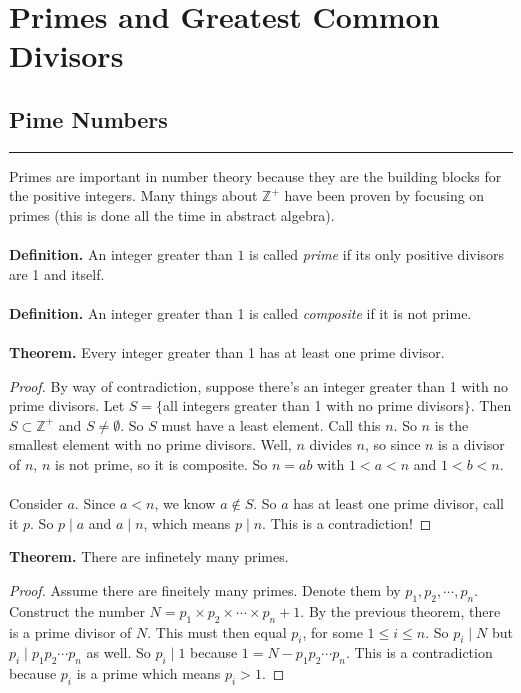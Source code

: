 \documentclass[class=article, crop=false]{standalone}
\def\integers{{\mathbb Z}}
\begin{document}
    
\section{Primes and Greatest Common Divisors}

\subsection{Pime Numbers}
\rule{\textwidth}{1pt}
Primes are important in number theory because they are the building blocks for the positive integers.
Many things about $\integers^+$ have been proven by focusing on primes (this is done all the time in abstract algebra).\\\\
\textbf{Definition.} An integer greater than $1$ is called \emph{prime} if its only positive divisors are 
1 and itself.\\\\
\textbf{Definition.} An integer greater than 1 is called \emph{composite} if it is not prime.\\\\
\textbf{Theorem.} Every integer greater than 1 has at least one prime divisor.
\begin{proof}
	By way of contradiction, suppose there's an integer greater than 1 with no prime divisors.
	Let $S=\{$all integers greater than 1 with no prime divisors$\}$.
	Then $S\subset\integers^+$ and $S\neq\emptyset$. So $S$ must have a least element. Call this $n$.
	So $n$ is the smallest element with no prime divisors. Well, $n$ divides $n$, so since $n$ is a divisor
	of $n$, $n$ is not prime, so it is composite. So $n=ab$ with $1<a<n$ and $1<b<n$.\\\\
	Consider $a$. Since $a<n$, we know $a\notin S$. So $a$ has at least one prime divisor, call it $p$.
	So $p\mid a$ and $a\mid n$, which means $p\mid n$. This is a contradiction!
\end{proof}
\noindent\textbf{Theorem.} There are infinetely many primes.
\begin{proof}
	Assume there are fineitely many primes. Denote them by $p_1, p_2, \cdots, p_n$. Construct the number
	$N=p_1\times p_2\times \cdots \times p_n + 1$. By the previous theorem, there is a prime divisor of $N$.
	This must then equal $p_i$, for some $1\leq i\leq n$. So $p_i \mid N$ but $p_i\mid p_1 p_2\cdots p_n$ as well.
	So $p_i\mid 1$ because $1=N-p_1p_2\cdots p_n$. This is a contradiction because $p_i$ is a prime which means $p_i >1$.
\end{proof}
\end{document}
